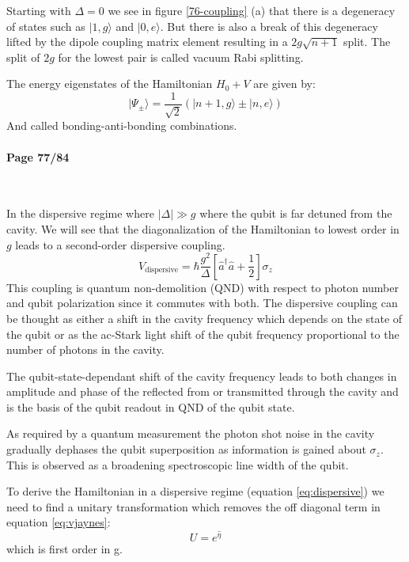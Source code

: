 \documentclass[12pt]{article}
\numberwithin{equation}{subsection}
\newcommand\page[1]{
{
\color{blue}\paragraph{
Page #1
}\mbox{}\\
}
}
\begin{document}
Starting with $\Delta=0$ we see in figure \ref{76-coupling} (a) that there is a degeneracy of states such as $|1,g\rangle$ and $|0,e\rangle$. But there is also a break of this degeneracy lifted by the dipole coupling matrix element resulting in a $2g\sqrt{n+1}$ split. The split of $2g$ for the lowest pair is called vacuum Rabi splitting.

The energy eigenstates of the Hamiltonian $H_0 + V$ are given by:
\begin{equation}
    | \Psi _\pm\rangle = \frac{1}{\sqrt2} (|n+1,g\rangle \pm |n,e\rangle)
\end{equation}
And called bonding-anti-bonding combinations.

\page{77/84}

In the dispersive regime where $|\Delta| \gg g$ where the qubit is far detuned from the cavity. We will see that the diagonalization of the Hamiltonian to lowest order in $g$ leads to a second-order dispersive coupling.
\begin{equation}
    V_{\textrm{dispersive}} = \hbar \frac{g^2}{\Delta} \left [ \hat a ^\dagger \hat a + \frac{1}{2} \right ] \sigma_z
    \label{eq:dispersive}
\end{equation}
This coupling is quantum non-demolition (QND) with respect to photon number and qubit polarization since it commutes with both.
The dispersive coupling can be thought as either a shift in the cavity frequency which depends on the state of the qubit or as the ac-Stark light shift of the qubit frequency proportional to the number of photons in the cavity. 

The qubit-state-dependant shift of the cavity frequency leads to both changes in amplitude and phase of the reflected from or transmitted through the cavity and is the basis of the qubit readout in QND of the qubit state.

As required by a quantum measurement the photon shot noise in the cavity gradually dephases the qubit superposition as information is gained about $\sigma_z$. This is observed as a broadening spectroscopic line width of the qubit.

To derive the Hamiltonian in a dispersive regime (equation \ref{eq:dispersive}) we need to find a unitary transformation which removes the off diagonal term in equation \ref{eq:vjaynes}:
\begin{equation}
    U=e^{\hat \eta}
    \label{eq:dispersive-unitary}
\end{equation}
which is first order in g.
\end{document}
